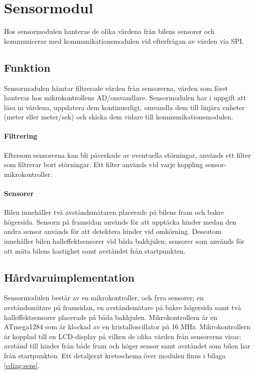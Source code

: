 \documentclass[tekniskrapport/tech.tex]{subfiles}
\begin{document}
\section{Sensormodul}
Hos sensormodulen hanteras de olika värdena från bilens sensorer och
kommunicerar med kommunikationsmodulen vid efterfrågan av värden via SPI.

\subsection{Funktion} Sensormodulen hämtar filtrerade värden från sensorerna,
värden som först hanteras hos mikrokontrollens AD/omvandlare. Sensormodulen
har i uppgift att läsa in värdena, uppdatera dem kontinuerligt, omvandla dem
till linjära enheter (meter eller meter/sek) och skicka dem vidare till
kommunikationsmodulen.

\paragraph{Filtrering} Eftersom sensorerna kan bli påverkade av eventuella
störningar, används ett filter som filtrerar bort störningar. Ett filter
används vid varje koppling sensor-mikrokontroller.

\paragraph{Sensorer} Bilen innehåller två avståndsmätaren placerade på bilens
fram och bakre högersida. Sensorn på framsidan används för att upptäcka hinder
medan den andra sensor används för att detektera hinder vid omkörning. Dessutom
innehåller bilen halleffektsensorer vid båda bakhjulen, sensorer som används
för att mäta bilens hastighet samt avståndet från startpunkten.

\subsection{Hårdvaruimplementation} Sensormodulen består av en mikrokontroller,
och fyra sensorer; en avståndsmätare på framsidan, en avståndsmätare på bakre
högersida samt två halleffektsensorer placerade på båda bakhjulen.
Mikrokontrollern är en ATmega1284 som är klockad av en kristalloscillator på 16
MHz. Mikrokontrollern är kopplad
till en LCD-display på vilken de olika värden från sensorerna visas; avstånd
till hinder från både fram och höger sensor samt avståndet som bilen har från
startpunkten. Ett detaljerat kretsschema över modulen finns i bilaga
\ref{cdiag:sens}.
\end{document}

